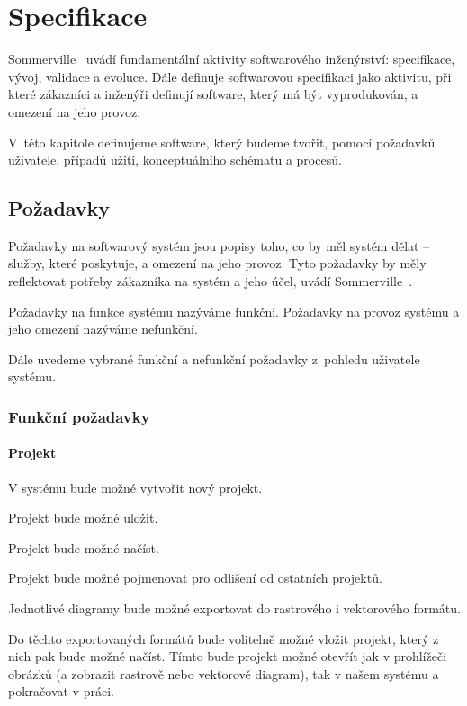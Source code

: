 \chapter{Specifikace}

Sommerville~\cite{sommerville_softwareengineering_2011} uvádí fundamentální aktivity softwarového inženýrství: specifikace, vývoj, validace a evoluce.
Dále definuje softwarovou specifikaci jako aktivitu, při které zákazníci a inženýři definují software, který má být vyprodukován, a omezení na jeho provoz.

V~této kapitole definujeme software, který budeme tvořit, pomocí požadavků uživatele, případů užití, konceptuálního schématu a procesů.

\section{Požadavky}

Požadavky na softwarový systém jsou popisy toho, co by měl systém dělat -- služby, které poskytuje, a omezení na jeho provoz.
Tyto požadavky by měly reflektovat potřeby zákazníka na systém a jeho účel, uvádí Sommerville~\cite[s.~83]{sommerville_softwareengineering_2011}.

Požadavky na funkce systému nazýváme funkční.
Požadavky na provoz systému a jeho omezení nazýváme nefunkční.

Dále uvedeme vybrané funkční a nefunkční požadavky z~pohledu uživatele systému.

\subsection{Funkční požadavky}

\subsubsection*{Projekt}
\begin{enumfp}
  \item V systému bude možné vytvořit nový projekt.
  \item Projekt bude možné uložit.
  \item Projekt bude možné načíst.
  \item Projekt bude možné pojmenovat pro odlišení od ostatních projektů.
  \item Jednotlivé diagramy bude možné exportovat do rastrového i vektorového formátu.
  \item Do těchto exportovaných formátů bude volitelně možné vložit projekt, který z nich pak bude možné načíst.
  Tímto bude projekt možné otevřít jak v prohlížeči obrázků (a zobrazit rastrově nebo vektorově diagram), tak v našem systému a pokračovat v práci.
\end{enumfp}

